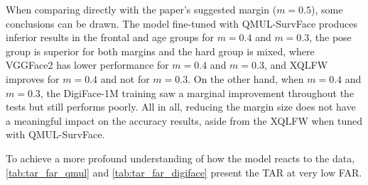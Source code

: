 \documentclass[class=report, crop=false, a4paper, 12pt]{standalone}
\begin{document}
\par When comparing directly with the paper's suggested margin ($m=0.5$), some conclusions can be drawn. The model fine-tuned with QMUL-SurvFace produces inferior results in the frontal and age groups for $m=0.4$ and $m=0.3$, the pose group is superior for both margins and the hard group is mixed, where VGGFace2 has lower performance for $m=0.4$ and $m=0.3$, and XQLFW improves for $m=0.4$ and not for $m=0.3$. On the other hand, when $m=0.4$ and $m=0.3$, the DigiFace-1M training saw a marginal improvement throughout the tests but still performs poorly. All in all, reducing the margin size does not have a meaningful impact on the accuracy results, aside from the XQLFW when tuned with QMUL-SurvFace.
\vspace{\baselineskip}
\par To achieve a more profound understanding of how the model reacts to the data, \autoref{tab:tar_far_qmul} and \autoref{tab:tar_far_digiface} present the TAR at very low FAR.
\end{document}
